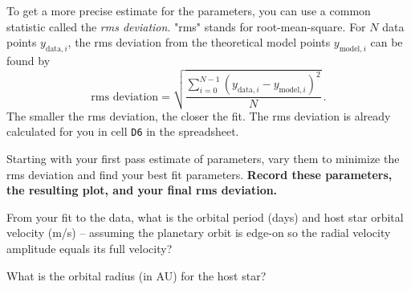 To get a more precise estimate for the parameters, you can use a common statistic called the \textit{rms deviation}. "rms" stands for root-mean-square. For $N$ data points $y_{\textrm{data},i}$, the rms deviation from the theoretical model points $y_{\textrm{model},i}$ can be found by
\begin{equation}
 \textrm{rms deviation} = \sqrt{\dfrac{\sum_{i=0}^{N-1} \left( y_{\textrm{data},i} - y_{\textrm{model},i} \right)^2}{N}} \,.
\end{equation}
The smaller the rms deviation, the closer the fit. The rms deviation is already calculated for you in cell \texttt{D6} in the spreadsheet.

\begin{steps}
	\item Starting with your first pass estimate of parameters, vary them to minimize the rms deviation and find your best fit parameters. \textbf{Record these parameters, the resulting plot, and your final rms deviation.}
\end{steps}

%

\begin{steps}
	\item From your fit to the data, what is the orbital period (days) and host star orbital velocity (m/s) -- assuming the planetary orbit is edge-on so the radial velocity amplitude equals its full velocity?
	
	\item What is the orbital radius (in AU) for the host star?
\end{steps}

